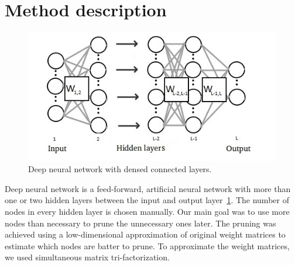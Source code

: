 \documentclass{article} %
\begin{document}

\section{Method description}
\begin{figure}[!ht]
\centering
\includegraphics[width=.6\textwidth]{globokamreza2.jpg}
\caption{Deep neural network with densed connected layers.}
\label{f:globokamreza}
\end{figure}
Deep neural network is a feed-forward, artificial neural network with more than 
one or two hidden layers between the input and output layer~\ref{f:globokamreza}. The number of nodes in every hidden 
layer is chosen manually. Our main goal was to use more nodes 
than necessary to prune the unnecessary ones later. The pruning was achieved using a low-dimensional approximation of original weight matrices to estimate which nodes are batter to prune. To approximate the weight matrices, we used simultaneous matrix tri-factorization.
\end{document}
